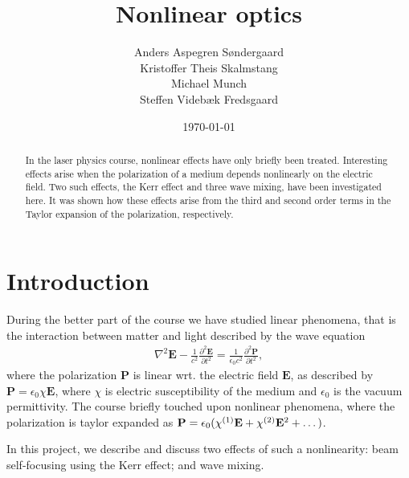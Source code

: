 \documentclass[a4paper,oneside,article]{memoir}
\newcommand\ppdiff[3][\partial]{\frac{#1^2 #2}{#1 #3^2}}
\newcommand{\order}[1]{^{\textup{(#1)}}} %
\begin{document}
\author{
  Anders Aspegren Søndergaard \\
  Kristoffer Theis Skalmstang \\
  Michael Munch \\
  Steffen Videbæk Fredsgaard \\
}
\title{Nonlinear optics}\date{\today}
\maketitle
\begin{abstract}

     \noindent In the laser physics course, nonlinear effects have only briefly
     been treated. Interesting effects arise when the polarization
     of a medium depends nonlinearly on the electric field.
     Two such effects, the Kerr effect and three wave mixing,
     have been investigated here. It was shown how these effects arise
     from the third and second order terms in the Taylor expansion of
     the polarization, respectively.
     
     

     
     

\end{abstract}
\tableofcontents*
\newpage
\chapter{Introduction}
\label{cha:intro}

During the better part of the course we have studied linear phenomena,
that is the interaction between matter and light described by the wave
equation
\begin{align}
  \label{eq:wave-general}
  \nabla^2 \mathbf E - \frac{1}{c^2} \ppdiff{\mathbf E}{t}
  = \frac{1}{\epsilon_0c^2} \ppdiff{\mathbf P}{t},
\end{align}
where the polarization $\mathbf P$ is linear wrt. the electric field
$\mathbf E$, as described by $\mathbf P = \epsilon_0 \chi
\mathbf E$, where $\chi$ is electric susceptibility of the medium and $\epsilon_0$ is the vacuum permittivity. The
course briefly touched upon nonlinear phenomena, where the polarization
is taylor expanded as $\mathbf P = \epsilon_0 ( \chi\order1 \mathbf E +
\chi\order2 \mathbf E^2 + \dots )$.

In this project, we describe and discuss two effects of such a nonlinearity: beam
self-focusing using the Kerr effect; and wave mixing.










\nocite{*}
\clearpage
\printbibliography
\end{document}

